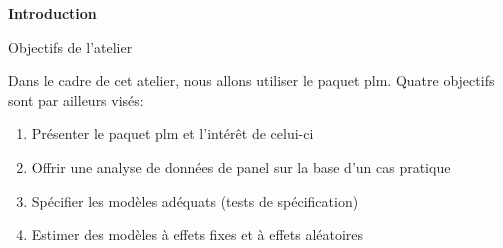 \documentclass{beamer}
\begin{document}
\begin{frame}{\textbf{Introduction}}
\begin{block}{Objectifs de l'atelier}
\end{block}
Dans le cadre de cet atelier, nous allons utiliser le paquet plm. Quatre objectifs sont par ailleurs vis\'es: 
\begin{enumerate}
\item Pr\'esenter le paquet plm et l'int\'er\^et de celui-ci
\item Offrir une analyse de donn\'ees de panel sur la base d'un cas pratique
\item Sp\'ecifier les mod\`eles ad\'equats (tests de sp\'ecification)
\item Estimer des mod\`eles \`a  effets fixes et \`a  effets al\'eatoires
\end{enumerate} 
\end{frame}
\end{document}
